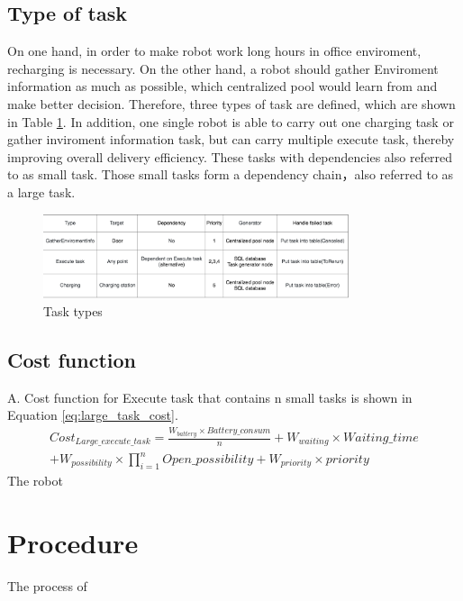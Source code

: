 \subsection{Type of task}
\label{sec:task_types}
On one hand, in order to make robot work long hours in office enviroment, recharging is necessary. On the other hand, a robot should gather Enviroment information as much as possible, which centralized pool would learn from and make better decision. 
Therefore, three types of task are defined, which are shown in Table \ref{fig:task_types}. In addition, one single robot is able to carry out one charging task or gather inviroment information task, but can carry multiple execute task, thereby improving overall delivery efficiency. These tasks with dependencies also referred to as small task. Those small tasks form a dependency chain，also referred to as a large task.


\begin{figure}[htb]
	\centering
	\includegraphics[width = 0.8\textwidth]{content/images/ch3/task_types.drawio.png}
	\caption{Task types}
	\label{fig:task_types}
\end{figure}

\subsection{Cost function}
	A. Cost function for Execute task that contains n small tasks is shown in Equation \ref{eq:large_task_cost}.
\begin{equation}
	\label{eq:large_task_cost}
	\begin{split}
	Cost_{Large\_execute\_task} = \frac{W_{battery} \times Battery\_consum}{n} + W_{waiting} \times Waiting\_time \\
	+ W_{possibility} \times \prod\limits_{i=1}^n Open\_possibility  + W_{priority} \times priority
	\end{split}
\end{equation}
The robot 

\section{Procedure}
The process of 

